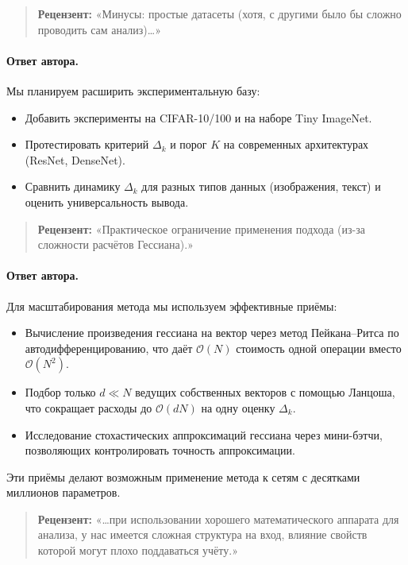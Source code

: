 \documentclass[11pt]{article}
\begin{document}
\begin{quote}
    \textbf{Рецензент:}
    «Минусы: простые датасеты (хотя, с другими было бы сложно проводить сам анализ)…»
\end{quote}

\paragraph{Ответ автора.}
Мы планируем расширить экспериментальную базу:
\begin{itemize}
    \item Добавить эксперименты на CIFAR-10/100 и на наборе Tiny ImageNet.
    \item Протестировать критерий \(\Delta_k\) и порог \(K\) на современных архитектурах (ResNet, DenseNet).
    \item Сравнить динамику \(\Delta_k\) для разных типов данных (изображения, текст) и оценить универсальность вывода.
\end{itemize}

\begin{quote}
    \textbf{Рецензент:}
    «Практическое ограничение применения подхода (из-за сложности расчётов Гессиана).»
\end{quote}

\paragraph{Ответ автора.}
Для масштабирования метода мы используем эффективные приёмы:
\begin{itemize}
    \item Вычисление произведения гессиана на вектор через метод Пейкана–Ритса по автодифференцированию, что даёт \(\mathcal{O}(N)\) стоимость одной операции вместо \(\mathcal{O}(N^2)\).
    \item Подбор только \(d\ll N\) ведущих собственных векторов с помощью Ланцоша, что сокращает расходы до \(\mathcal{O}(dN)\) на одну оценку \(\Delta_k\).
    \item Исследование стохастических аппроксимаций гессиана через мини-бэтчи, позволяющих контролировать точность аппроксимации.
\end{itemize}
Эти приёмы делают возможным применение метода к сетям с десятками миллионов параметров.

\begin{quote}
    \textbf{Рецензент:}
    «…при использовании хорошего математического аппарата для анализа, у нас имеется сложная структура на вход, влияние свойств которой могут плохо поддаваться учёту.»
\end{quote}
\end{document}
